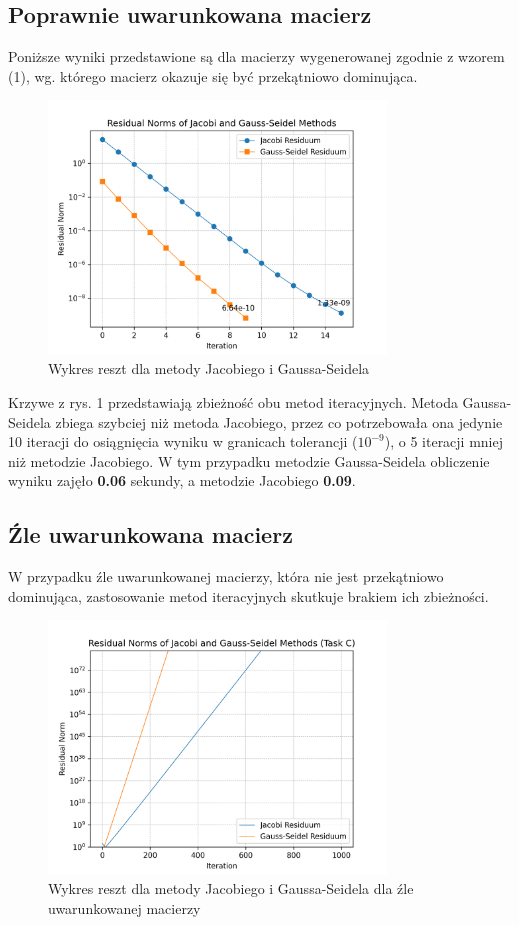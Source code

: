 \documentclass[a4paper,12pt]{article}  %
\begin{document}
\subsection{Poprawnie uwarunkowana macierz}

Poniższe wyniki przedstawione są dla macierzy wygenerowanej zgodnie z wzorem
(1), wg. którego macierz okazuje się być przekątniowo dominująca.


\begin{figure}[H]
  \centering
  \includegraphics[width=0.8\textwidth]{./graphs/residuals_task_a.png}
  \caption{Wykres reszt dla metody Jacobiego i Gaussa-Seidela}
\end{figure}
Krzywe z rys. 1 przedstawiają zbieżność obu metod iteracyjnych. Metoda 
Gaussa-Seidela zbiega szybciej niż metoda Jacobiego, przez co potrzebowała
ona jedynie 10 iteracji do osiągnięcia wyniku w granicach tolerancji
($10^{-9}$), o 5 iteracji mniej niż metodzie Jacobiego. W tym przypadku metodzie 
Gaussa-Seidela obliczenie wyniku zajęło \textbf{0.06} sekundy, a metodzie
Jacobiego \textbf{0.09}.

\subsection{Źle uwarunkowana macierz}
W przypadku źle uwarunkowanej macierzy, która nie jest przekątniowo
dominująca, zastosowanie metod iteracyjnych skutkuje brakiem
ich zbieżności.

\begin{figure}[H]
  \centering
  \includegraphics[width=0.8\textwidth]{./graphs/residuals_task_c.png}
  \caption{Wykres reszt dla metody Jacobiego i Gaussa-Seidela dla źle
  uwarunkowanej macierzy}
\end{figure}
\end{document}
